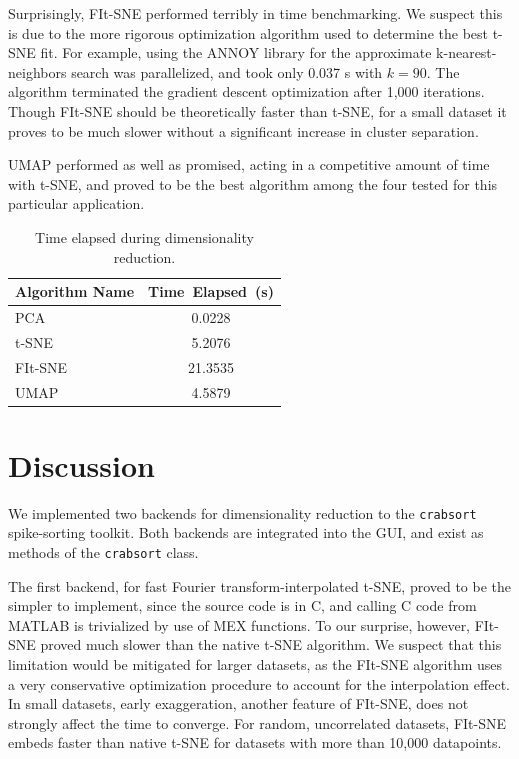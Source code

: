 \documentclass{article}
\begin{document}
Surprisingly, FIt-SNE performed terribly in time benchmarking.
We suspect this is due to the more rigorous optimization algorithm used
to determine the best t-SNE fit.
For example, using the ANNOY library for the approximate k-nearest-neighbors
search was parallelized, and took only 0.037 s with $k=90$.
The algorithm terminated the gradient descent optimization after 1,000 iterations.
Though FIt-SNE should be theoretically faster than t-SNE, for a small dataset
it proves to be much slower without a significant increase in cluster separation.

UMAP performed as well as promised, acting in a competitive amount of time with t-SNE,
and proved to be the best algorithm among the four tested for this particular application.

\begin{table}
  \caption{Time elapsed during dimensionality reduction.}
  \label{tbl:dim-red-time}
  \centering
  \begin{tabular}{lS}
    \toprule
    Algorithm Name     & Time~Elapsed~(s) \\
    \midrule
    PCA     & 0.0228 \\
    t-SNE   & 5.2076 \\
    FIt-SNE & 21.3535 \\
    UMAP    & 4.5879 \\
    \bottomrule
  \end{tabular}
\end{table}

\section{Discussion}

We implemented two backends for dimensionality reduction to the \texttt{crabsort}
spike-sorting toolkit.
Both backends are integrated into the GUI,
and exist as methods of the \texttt{crabsort} class.

The first backend, for fast Fourier transform-interpolated t-SNE,
proved to be the simpler to implement, since the source code is in C,
and calling C code from MATLAB is trivialized by use of MEX functions.
To our surprise, however, FIt-SNE proved much slower than the native t-SNE
algorithm.
We suspect that this limitation would be mitigated for larger datasets,
as the FIt-SNE algorithm uses a very conservative optimization procedure
to account for the interpolation effect.
In small datasets, early exaggeration, another feature of FIt-SNE, does not strongly
affect the time to converge.
For random, uncorrelated datasets, FIt-SNE embeds faster than native t-SNE
for datasets with more than 10,000 datapoints.
\end{document}
